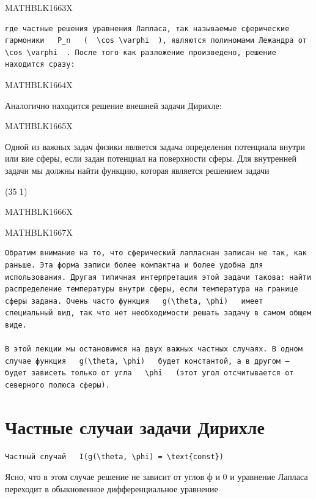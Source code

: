 \documentclass[
]{article}
\begin{document}
MATHBLK1663X

\begin{verbatim}
где частные решения уравнения Лапласа, так называемые сферические гармоники   P_n   (  \cos \varphi  ), являются полиномами Лежандра от   \cos \varphi  . После того как разложение произведено, решение находится сразу:
\end{verbatim}

MATHBLK1664X

Аналогично находится решение внешней задачи Дирихле:

MATHBLK1665X

Одной из важных задач физики является задача определения потенциала
внутри или вие сферы, если задан потенциал на поверхности сферы. Для
внутренней задачи мы должны найти функцию, которая является решением
задачи

(35 1)

MATHBLK1666X

MATHBLK1667X

\begin{verbatim}
Обратим внимание на то, что сферический лапласнан записан не так, как раньше. Эта форма записи более компактна и более удобна для использования. Другая типичная интерпретация этой задачи такова: найти распределение температуры внутри сферы, если температура на границе сферы задана. Очень часто функция   g(\theta, \phi)   имеет специальный вид, так что нет необходимости решать задачу в самом общем виде.

В этой лекции мы остановимся на двух важных частных случаях. В одном случае функция   g(\theta, \phi)   будет константой, а в другом — будет зависеть только от угла   \phi   (этот угол отсчитывается от северного полюса сферы).
\end{verbatim}

\section{Частные случаи задачи
Дирихле}\label{ux447ux430ux441ux442ux43dux44bux435-ux441ux43bux443ux447ux430ux438-ux437ux430ux434ux430ux447ux438-ux434ux438ux440ux438ux445ux43bux435}

\begin{verbatim}
Частный случай   I(g(\theta, \phi) = \text{const})
\end{verbatim}

Ясно, что в этом случае решение не зависит от углов ф и 0 и уравнение
Лапласа переходит в обыкновенное дифференциальное уравнение
\end{document}
